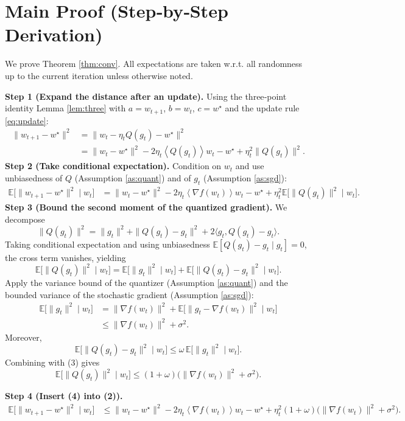 \documentclass{article}
\newcommand{\EE}{\mathbb{E}}
\newcommand{\inner}[1]{\left\langle#1\right\rangle}
\begin{document}
\section*{Main Proof (Step‑by‑Step Derivation)}
We prove Theorem \ref{thm:conv}. All expectations are taken w.r.t. all randomness up to the current iteration unless otherwise noted.

\bigskip
\noindent\textbf{Step 1 (Expand the distance after an update).}  
Using the three‑point identity Lemma \ref{lem:three} with $a=w_{t+1}$, $b=w_t$, $c=w^\star$ and the update rule \eqref{eq:update}:
\begin{align}
\|w_{t+1}-w^\star\|^2 
&= \|w_t-\eta_t Q(g_t)-w^\star\|^2 \nonumber\\
&= \|w_t-w^\star\|^2 -2\eta_t\inner{Q(g_t)}{w_t-w^\star}+\eta_t^2\|Q(g_t)\|^2 .\tag{1}
\end{align}
\noindent\textbf{Step 2 (Take conditional expectation).}  
Condition on $w_t$ and use unbiasedness of $Q$ (Assumption \ref{as:quant}) and of $g_t$ (Assumption \ref{as:sgd}):
\begin{align}
\EE\!\big[\|w_{t+1}-w^\star\|^2\mid w_t\big] 
&= \|w_t-w^\star\|^2 
-2\eta_t\inner{\nabla f(w_t)}{w_t-w^\star}
+\eta_t^2\EE\!\big[\|Q(g_t)\|^2\mid w_t\big].\tag{2}
\end{align}
\noindent\textbf{Step 3 (Bound the second moment of the quantized gradient).}  
We decompose
\[
\|Q(g_t)\|^2 = \|g_t\|^2 + \|Q(g_t)-g_t\|^2 + 2\langle g_t, Q(g_t)-g_t\rangle .
\]
Taking conditional expectation and using unbiasedness $\EE[Q(g_t)-g_t\mid g_t]=0$, the cross term vanishes, yielding
\[
\EE\!\big[\|Q(g_t)\|^2\mid w_t\big]
= \EE\!\big[\|g_t\|^2\mid w_t\big] + \EE\!\big[\|Q(g_t)-g_t\|^2\mid w_t\big].
\]
Apply the variance bound of the quantizer (Assumption \ref{as:quant}) and the bounded variance of the stochastic gradient (Assumption \ref{as:sgd}):
\begin{align}
\EE\!\big[\|g_t\|^2\mid w_t\big] 
&= \|\nabla f(w_t)\|^2 + \EE\!\big[\|g_t-\nabla f(w_t)\|^2\mid w_t\big] \nonumber\\
&\le \|\nabla f(w_t)\|^2 + \sigma^2 .\tag{3}
\end{align}
Moreover,
\[
\EE\!\big[\|Q(g_t)-g_t\|^2\mid w_t\big]\le \omega\,\EE\!\big[\|g_t\|^2\mid w_t\big] .
\]
Combining with (3) gives
\[
\EE\!\big[\|Q(g_t)\|^2\mid w_t\big]
\le (1+\omega)\big(\|\nabla f(w_t)\|^2+\sigma^2\big).\tag{4}
\]

\noindent\textbf{Step 4 (Insert (4) into (2)).}
\begin{align}
\EE\!\big[\|w_{t+1}-w^\star\|^2\mid w_t\big] 
&\le \|w_t-w^\star\|^2 
-2\eta_t\inner{\nabla f(w_t)}{w_t-w^\star}
+\eta_t^2(1+\omega)\big(\|\nabla f(w_t)\|^2+\sigma^2\big). \tag{5}
\end{align}
\end{document}

